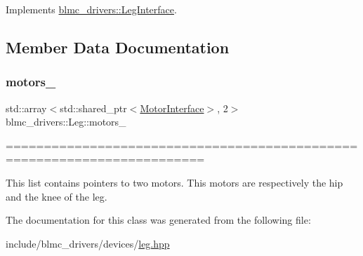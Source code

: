 Implements \hyperlink{classblmc__drivers_1_1LegInterface_ab724283c8eeadca0e7b8829de64f4f44}{blmc\+\_\+drivers\+::\+Leg\+Interface}.



\subsection{Member Data Documentation}
\mbox{\label{classblmc__drivers_1_1Leg_a78289d4c19fc35dbc3e7dd849e57479e}} 
\subsubsection{\texorpdfstring{motors\+\_\+}{motors\_}}
{\footnotesize\ttfamily std\+::array$<$std\+::shared\+\_\+ptr$<$\hyperlink{classblmc__drivers_1_1MotorInterface}{Motor\+Interface}$>$, 2$>$ blmc\+\_\+drivers\+::\+Leg\+::motors\+\_\+\hspace{0.3cm}{\ttfamily [private]}}



======================================================================== 

This list contains pointers to two motors. This motors are respectively the hip and the knee of the leg. 

The documentation for this class was generated from the following file\+:\begin{DoxyCompactItemize}
\item 
include/blmc\+\_\+drivers/devices/\hyperlink{leg_8hpp}{leg.\+hpp}\end{DoxyCompactItemize}
